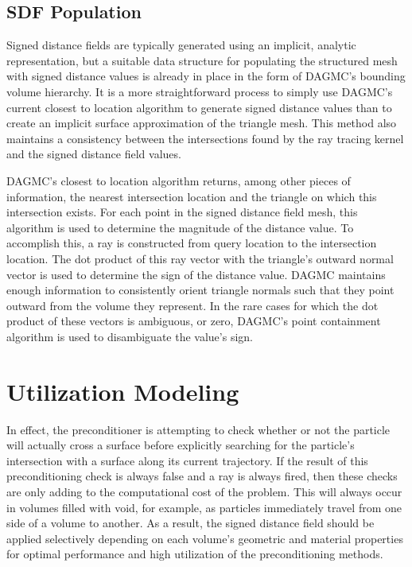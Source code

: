 \subsection{SDF Population}

Signed distance fields are typically generated using an implicit, analytic
representation, but a suitable data structure for populating the structured mesh
with signed distance values is already in place in the form of DAGMC's bounding
volume hierarchy. It is a more straightforward process to simply use DAGMC's
current closest to location algorithm to generate signed distance values than to
create an implicit surface approximation of the triangle mesh. This method also
maintains a consistency between the intersections found by the ray tracing
kernel and the signed distance field values.

DAGMC's closest to location algorithm returns, among other pieces of
information, the nearest intersection location and the triangle on which this
intersection exists. For each point in the signed distance field mesh, this
algorithm is used to determine the magnitude of the distance value. To
accomplish this, a ray is constructed from query location to the intersection
location. The dot product of this ray vector with the triangle's outward normal
vector is used to determine the sign of the distance value. DAGMC maintains
enough information to consistently orient triangle normals such that they point
outward from the volume they represent. In the rare cases for which the dot
product of these vectors is ambiguous, or zero, DAGMC's point containment
algorithm is used to disambiguate the value's sign.

\section{Utilization Modeling}\label{section:preconditioner_utilization}

In effect, the preconditioner is attempting to check whether or not the particle
will actually cross a surface before explicitly searching for the particle's
intersection with a surface along its current trajectory. If the result of this
preconditioning check is always false and a ray is always fired, then these
checks are only adding to the computational cost of the problem. This will
always occur in volumes filled with void, for example, as particles immediately
travel from one side of a volume to another. As a result, the signed distance field
should be applied selectively depending on each volume's geometric and material
properties for optimal performance and high utilization of the preconditioning
methods.

